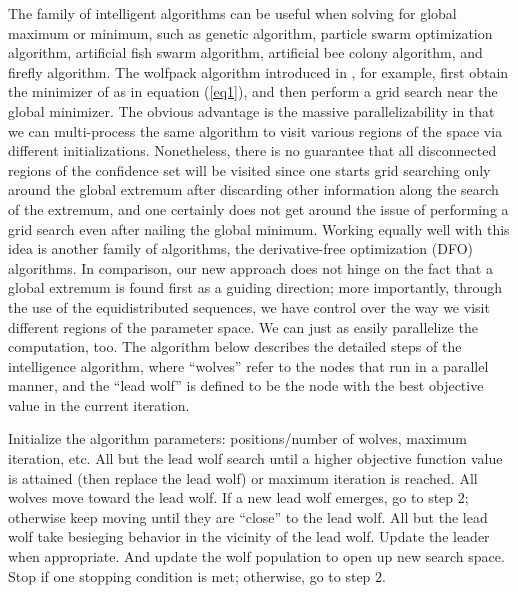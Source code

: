 \documentclass[12pt]{article}
\theoremstyle{definition}
\begin{document}
The family of intelligent algorithms can be useful when solving for global maximum or minimum, such as genetic algorithm, particle swarm optimization algorithm, artificial fish swarm algorithm, artificial bee colony algorithm, and firefly algorithm. The wolfpack algorithm introduced in \cite{WZ-2014}, for example, first obtain the minimizer of as in equation (\ref{eq1}), and then perform a grid search near the global minimizer. The obvious advantage is the massive parallelizability in that we can multi-process the same algorithm to visit various regions of the space via different initializations. Nonetheless, there is no guarantee that all disconnected regions of the confidence set will be visited since one starts grid searching only around the global extremum after discarding other information along the search of the extremum, and one certainly does not get around the issue of performing a grid search even after nailing the global minimum. Working equally well with this idea is another family of algorithms, the derivative-free optimization (DFO) algorithms. In comparison, our new approach does not hinge on the fact that a global extremum is found first as a guiding direction; more importantly, through the use of the equidistributed sequences, we have control over the way we visit different regions of the parameter space. We can just as easily parallelize the computation, too. The algorithm below describes the detailed steps of the intelligence algorithm, where ``wolves'' refer to the nodes that run in a parallel manner, and the ``lead wolf'' is defined to be the node with the best objective value in the current iteration. 

\begin{algorithm}
\begin{algorithmic}[1]
\STATE Initialize the algorithm parameters: positions/number of wolves, maximum iteration, etc.
\STATE All but the lead wolf search until a higher objective function value is attained (then replace the lead wolf) or maximum iteration is reached.
\STATE All wolves move toward the lead wolf. If a new lead wolf emerges, go to step $2$; otherwise keep moving until they are ``close'' to the lead wolf. 
\STATE All but the lead wolf take besieging behavior in the vicinity of the lead wolf.
\STATE Update the leader when appropriate. And update the wolf population to open up new search space.
\STATE Stop if one stopping condition is met; otherwise, go to step $2$.
\end{algorithmic}
\caption{\cite{WZ-2014}: Wolf Pack Algorithm}
\label{alg}
\end{algorithm}
\end{document}
